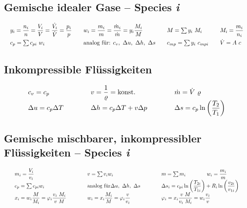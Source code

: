 \subsection{Gemische idealer Gase -- Species \textit{i}}
	\setlength{\abovedisplayshortskip}{-15pt}
		\[ \arraycolsep=1em %
		\begin{array}{llll}
			y_i = \dfrac{n_i}{n} = \dfrac{V_i}{V} = \dfrac{\dot{V_i}}{\dot{V}} = \dfrac{p_i}{p} & w_i  =  \dfrac{m_i}{m}  = \dfrac{\dot{m}_i}{\dot{m}} =  y_i \dfrac{M_i}{M} & M = \sum y_i\ M_i          & M_i = \dfrac{m_i}{n_i} \\
			c_p = \sum c_{pi}\ w_i                                                              & \text{analog für: }  c_v,\ \Delta u,\ \Delta h,\ \Delta s                  & c_{mp} = \sum y_i\ c_{mpi} & \dot{V} = A\ c
		\end{array} \]

\subsection{Inkompressible Flüssigkeiten}
	\setlength{\abovedisplayshortskip}{-20pt}
		\[ \arraycolsep=2em %
		\begin{array}{lll}
			c_v = c_p               & v = \dfrac{1}{\varrho} = \text{konst.} & \dot{m} = \dot{V}\ \varrho                      \\
			\Delta u = c_p \Delta T & \Delta h = c_p \Delta T + v \Delta p   & \Delta s = c_p \ln\left(\dfrac{T_2}{T_1}\right)
		\end{array} \]

\subsection{Gemische mischbarer, inkompressibler Flüssigkeiten -- Species \textit{i}}
	\setlength{\abovedisplayskip}{-15pt}
		\[  \arraycolsep=2em  \def\arraystretch{1.5}
		\begin{array}{lll}
			m_i = \dfrac{V_i}{v_i} & v   = \sum v_i w_i                                 & m   = \sum m_i   \qquad\qquad   w_i = \dfrac{m_i}{m}                                                    \\
			c_p = \sum c_{pi} w_i  & \text{analog für}   \Delta u,\ \Delta h,\ \Delta s & \Delta s_i = c_{pi} \ln\left(\dfrac{T_{2i}}{T_{1i}}\right) + R_i \ln\left(\dfrac{v_{2i}}{v_{1i}}\right) \\
			x_i = w_i \dfrac{M}{M_i} = \varphi_i \dfrac{v_i\ M_i}{v\ M} & w_i = x_i \dfrac{M_i}{M} = \varphi_i \dfrac{v}{v_i} & \varphi_i = x_i \dfrac{v\ M}{v_i\ M_i} = w_i \dfrac{v_i}{v}
		\end{array} \]


